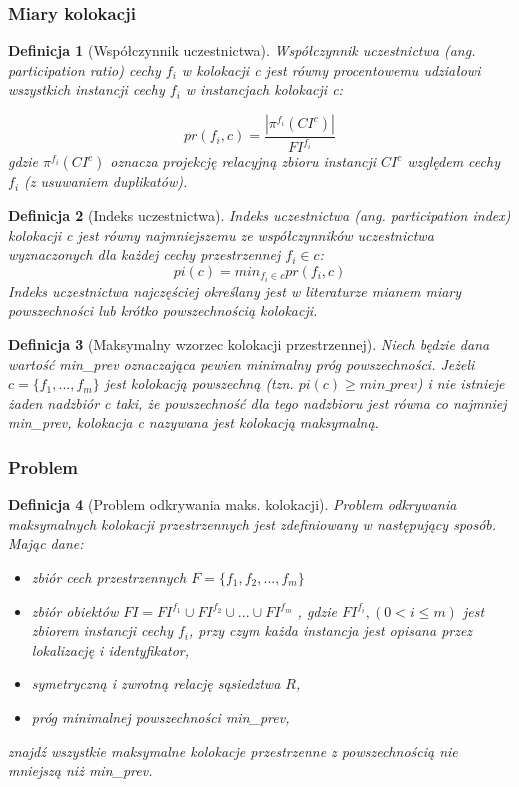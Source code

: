 \documentclass[12pt]{article}
\newtheorem{defin}{Definicja}
\begin{document}
\subsubsection{Miary kolokacji}

\begin{defin}[Współczynnik uczestnictwa]
Współczynnik uczestnictwa (ang. participation ratio) cechy $ f_{i} $ w kolokacji c jest równy procentowemu udziałowi wszystkich instancji cechy $ f_{i} $ w instancjach kolokacji c:

\begin{equation}
pr(f_{i}, c) = \frac{|\pi^{f_{i}}(CI^{c})|}{FI^{f_{i}}}
\end{equation}
gdzie $ \pi^{f_{i}}(CI^{c})$ oznacza projekcję relacyjną zbioru instancji $ CI^{c}$ względem cechy $f_{i}$ (z usuwaniem duplikatów).
\end{defin}

\begin{defin}[Indeks uczestnictwa]Indeks uczestnictwa (ang. participation index) kolokacji c jest równy najmniejszemu ze współczynników uczestnictwa wyznaczonych dla każdej cechy przestrzennej $ f_{i} \in c$:
\begin{equation}
pi(c) = min_{f_{i} \in c} pr(f_{i} ,c)
\end{equation}
Indeks uczestnictwa najczęściej określany jest w literaturze mianem miary powszechności lub krótko powszechnością kolokacji.
\label{def:prevalence}
\end{defin}

\begin{defin}[Maksymalny wzorzec kolokacji przestrzennej]Niech będzie dana wartość min\_prev oznaczająca pewien minimalny próg powszechności. Jeżeli $ c = \{f_{1},...,f_{m} \} $ jest kolokacją powszechną (tzn. $ pi(c) \ge min\_prev $) i nie istnieje żaden nadzbiór c taki, że powszechność dla tego nadzbioru jest równa co najmniej min\_prev, kolokacja c nazywana jest kolokacją maksymalną.  
\end{defin}

\subsubsection{Problem}

\begin{defin}[Problem odkrywania maks. kolokacji]
Problem odkrywania maksymalnych kolokacji przestrzennych jest zdefiniowany w następujący sposób.
Mając dane:
\begin{itemize}
\item zbiór cech przestrzennych $F = \{ f_{1}, f_{2}, ...,f_{m} \} $
\item zbiór obiektów $FI = FI^{f_{1}} \cup FI^{f_{2}} \cup ... \cup FI^{f_{m}}$  , gdzie $ FI^{f_{i}},(0 < i \le m) $ jest zbiorem instancji cechy $ f_{i}$, przy czym każda instancja jest opisana przez lokalizację i identyfikator,
\item symetryczną i zwrotną relację sąsiedztwa $R$,
\item próg minimalnej powszechności min\_prev,
\end{itemize}
znajdź wszystkie maksymalne kolokacje przestrzenne z powszechnością nie mniejszą niż min\_prev.
\end{defin}
\end{document}
